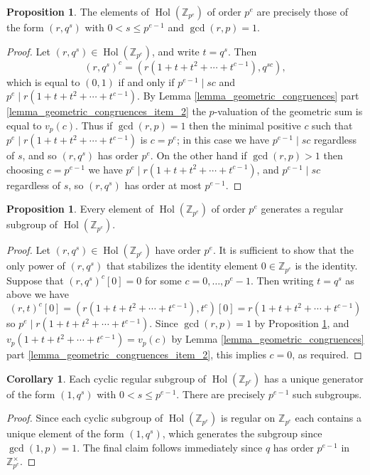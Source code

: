 \documentclass[reqno]{amsart}
\theoremstyle{definition}
\newtheorem{proposition}[theorem]{Proposition}
\newtheorem{corollary}[theorem]{Corollary}
\newcommand{\Z}{\mathbb{Z}}
\DeclareMathOperator{\Hol}{\mbox{Hol}}
\begin{document}
\begin{proposition} \label{prop_p_e_order} %
The elements of $ \Hol(\Z_{p^{e}}) $ of order $ p^{e} $ are precisely those of the form $ (r,q^{s}) $ with $ 0 < s \leq p^{e-1} $ and $ \gcd(r,p)=1 $. 
\end{proposition}
\begin{proof}
Let $ (r,q^{s}) \in \Hol(\Z_{p^{e}}) $, and write $ t=q^{s} $. Then
\[ (r,q^{s})^{c} = (r(1+t+t^{2}+\cdots + t^{c-1}),q^{sc}), \]
which is equal to $ (0,1) $ if and only if $ p^{e-1} \mid sc $ and $ p^{e} \mid r(1+t+t^{2}+\cdots + t^{c-1}) $. By Lemma \ref{lemma_geometric_congruences} part \ref{lemma_geometric_congruences_item_2} the $ p $-valuation of the geometric sum is equal to $ v_{p}(c) $. Thus if $ \gcd(r,p)=1 $ then the minimal positive $ c $ such that $ p^{e} \mid r(1+t+t^{2}+\cdots + t^{c-1}) $ is $ c=p^{e} $; in this case we have $ p^{e-1} \mid sc $ regardless of $ s $, and so $ (r,q^{s}) $ has order $ p^{e} $. On the other hand if $ \gcd(r,p)>1 $ then choosing $ c=p^{e-1} $ we have $ p^{e} \mid r(1+t+t^{2}+\cdots + t^{c-1}) $, and $ p^{e-1} \mid sc $ regardless of $ s $, so $ (r,q^{s}) $ has order at most $ p^{e-1} $.
\end{proof}


\begin{proposition} \label{prop_p_e_regular} 
Every element of $ \Hol(\Z_{p^{e}}) $ of order $ p^{e} $ generates a regular subgroup of $ \Hol(\Z_{p^{e}}) $. 
\end{proposition}
\begin{proof}
Let $ (r,q^{s}) \in \Hol(\Z_{p^{e}}) $ have order $ p^{e} $. It is sufficient to show that the only power of $ (r,q^{s}) $ that stabilizes the identity element $ 0 \in \Z_{p^{e}} $ is the identity. Suppose that $ (r,q^{s})^{c}[0] = 0 $ for some $ c = 0, \ldots ,p^{e}-1 $. Then writing $ t=q^{s} $ as above we have
\[ (r,t)^{c}[0] = (r(1+t+t^{2}+ \cdots +t^{c-1}),t^{c}) [0] = r(1+t+t^{2}+ \cdots + t^{c-1}) \]
so $ p^{e} \mid r(1+t+t^{2}+ \cdots + t^{c-1}) $. Since $ \gcd(r,p)=1 $ by Proposition \ref{prop_p_e_order}, and $ v_{p}(1+t+t^{2}+\cdots + t^{c-1}) = v_{p}(c) $ by Lemma \ref{lemma_geometric_congruences} part \ref{lemma_geometric_congruences_item_2}, this implies $ c=0 $, as required. 
\end{proof}

\begin{corollary}
Each cyclic regular subgroup of $ \Hol(\Z_{p^{e}}) $ has a unique generator of the form $ (1,q^{s}) $ with $ 0 < s \leq p^{e-1} $. There are precisely $ p^{e-1}$ such subgroups. 
\end{corollary}
\begin{proof}
Since each cyclic subgroup of $ \Hol(\Z_{p^{e}}) $ is regular on $ \Z_{p^{e}} $ each contains a unique element of the form $ (1,q^{s}) $, which generates the subgroup since $ \gcd(1,p)=1 $. The final claim follows immediately since $ q $ has order $ p^{e-1} $ in $ \Z_{p^{e}}^{\times} $.
\end{proof}
\end{document}
